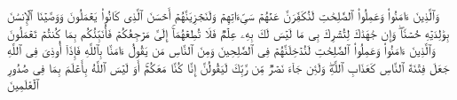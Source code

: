 \stopbuffer%
\startbuffer[\q:29:7]
وَٱلَّذِینَ ءَامَنُوا۟ وَعَمِلُوا۟ ٱلصَّٰلِحَٰتِ لَنُكَفِّرَنَّ عَنۡهُمۡ سَیِّءَاتِهِمۡ وَلَنَجۡزِیَنَّهُمۡ أَحۡسَنَ ٱلَّذِی كَانُوا۟ یَعۡمَلُونَ%
\stopbuffer%
\startbuffer[\q:29:8]
وَوَصَّیۡنَا ٱلۡإِنسَٰنَ بِوَٰلِدَیۡهِ حُسۡنࣰاۖ وَإِن جَٰهَدَٰكَ لِتُشۡرِكَ بِی مَا لَیۡسَ لَكَ بِهِۦ عِلۡمࣱ فَلَا تُطِعۡهُمَاۤۚ إِلَیَّ مَرۡجِعُكُمۡ فَأُنَبِّئُكُم بِمَا كُنتُمۡ تَعۡمَلُونَ%
\stopbuffer%
\startbuffer[\q:29:9]
وَٱلَّذِینَ ءَامَنُوا۟ وَعَمِلُوا۟ ٱلصَّٰلِحَٰتِ لَنُدۡخِلَنَّهُمۡ فِی ٱلصَّٰلِحِینَ%
\stopbuffer%
\startbuffer[\q:29:10]
وَمِنَ ٱلنَّاسِ مَن یَقُولُ ءَامَنَّا بِٱللَّهِ فَإِذَاۤ أُوذِیَ فِی ٱللَّهِ جَعَلَ فِتۡنَةَ ٱلنَّاسِ كَعَذَابِ ٱللَّهِۖ وَلَئِن جَاۤءَ نَصۡرࣱ مِّن رَّبِّكَ لَیَقُولُنَّ إِنَّا كُنَّا مَعَكُمۡۚ أَوَ لَیۡسَ ٱللَّهُ بِأَعۡلَمَ بِمَا فِی صُدُورِ ٱلۡعَٰلَمِینَ%
\stopbuffer%
